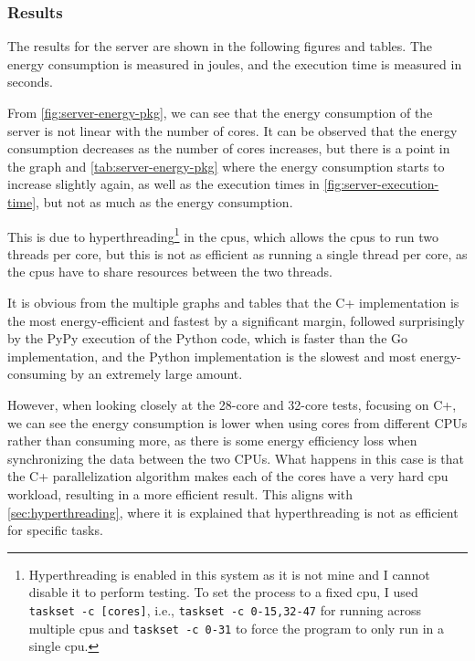 \subsubsection{Results}

The results for the server are shown in the following figures and tables. The energy consumption is measured in joules, and the execution time is measured in seconds. 








From \autoref{fig:server-energy-pkg}, we can see that the energy consumption of the server is not linear with the number of cores. It can be observed that the energy consumption decreases as the number of cores increases, but there is a point in the graph and \autoref{tab:server-energy-pkg} where the energy consumption starts to increase slightly again, as well as the execution times in \autoref{fig:server-execution-time}, but not as much as the energy consumption.

This is due to hyperthreading\footnote{Hyperthreading is enabled in this system as it is not mine and I cannot disable it to perform testing. To set the process to a fixed \gls{cpu}, I used \texttt{taskset -c [cores]}, i.e., \texttt{taskset -c 0-15,32-47} for running across multiple \glspl{cpu} and \texttt{taskset -c 0-31} to force the program to only run in a single \gls{cpu}.} in the \glspl{cpu}, which allows the \glspl{cpu} to run two threads per core, but this is not as efficient as running a single thread per core, as the \glspl{cpu} have to share resources between the two threads.

It is obvious from the multiple graphs and tables that the C\++ implementation is the most energy-efficient and fastest by a significant margin, followed surprisingly by the PyPy execution of the Python code, which is faster than the Go implementation, and the Python implementation is the slowest and most energy-consuming by an extremely large amount.

However, when looking closely at the 28-core and 32-core tests, focusing on C\++, we can see the energy consumption is lower when using cores from different CPUs rather than consuming more, as there is some energy efficiency loss when synchronizing the data between the two CPUs. What happens in this case is that the C\++ parallelization algorithm makes each of the cores have a very hard \gls{cpu} workload, resulting in a more efficient result. This aligns with \autoref{sec:hyperthreading}, where it is explained that hyperthreading is not as efficient for specific tasks.

